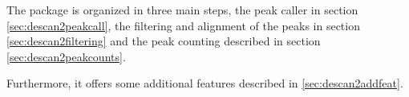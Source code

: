The package is organized in three main steps, the peak caller in section \ref{sec:descan2peakcall}, the filtering and alignment of the peaks in section \ref{sec:descan2filtering} and the peak counting described in section \ref{sec:descan2peakcounts}.

Furthermore, it offers some additional features described in \ref{sec:descan2addfeat}.